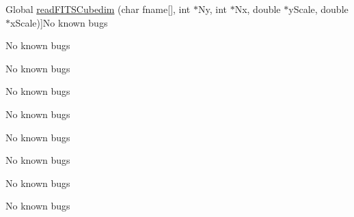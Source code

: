 \begin{DoxyRefList}
\hypertarget{bug__bug000016}{}%
Global \hyperlink{io_8c_ad0be222f95ff496610bb360e01aab56d}{read\+F\+I\+T\+S\+Cubedim} (char fname\mbox{[}\mbox{]}, int $\ast$\+Ny, int $\ast$\+Nx, double $\ast$y\+Scale, double $\ast$x\+Scale)]No known bugs 
\item[\label{bug__bug000015}%
\hypertarget{bug__bug000015}{}%
Global \hyperlink{io_8c_a1093cacb975cf9e6dc3845a1f65f53dd}{read\+F\+I\+T\+S\+Image} (char fname\mbox{[}\mbox{]}, int Ny, int Nx, int Npad, double $\ast$\+Image)]No known bugs 
\item[\label{bug__bug000014}%
\hypertarget{bug__bug000014}{}%
Global \hyperlink{io_8c_ae9ee556f23e84209607c2940391b6fa6}{read\+F\+I\+T\+S\+Imagedim} (char fname\mbox{[}\mbox{]}, int $\ast$\+Ny, int $\ast$\+Nx, double $\ast$y\+Scale, double $\ast$x\+Scale)]No known bugs 
\item[\label{bug__bug000023}%
\hypertarget{bug__bug000023}{}%
File \hyperlink{synthimage_8c}{synthimage.c} ]No known bugs 
\item[\label{bug__bug000009}%
\hypertarget{bug__bug000009}{}%
File \hyperlink{tabcalc_8c}{tabcalc.c} ]No known bugs 
\item[\label{bug__bug000010}%
\hypertarget{bug__bug000010}{}%
File \hyperlink{tablist_8c}{tablist.c} ]No known bugs 
\item[\label{bug__bug000011}%
\hypertarget{bug__bug000011}{}%
File \hyperlink{tabmerge_8c}{tabmerge.c} ]No known bugs 
\item[\label{bug__bug000019}%
\hypertarget{bug__bug000019}{}%
Global \hyperlink{io_8c_a9403cd46eafa834291081dcb30e0a528}{write\+F\+I\+T\+S\+Image} (char fname\mbox{[}\mbox{]}, int Npixel, double pixel\+Size, double $\ast$\+Image, char hist\mbox{[}\mbox{]})]No known bugs 
\item[\label{bug__bug000018}%
\hypertarget{bug__bug000018}{}%
Global \hyperlink{io_8c_ab884e4759cc79d219ef42f9e6835c2b1}{write\+F\+I\+T\+S\+Vis} (char fname\mbox{[}\mbox{]}, int Ny, int Nx, double $\ast$\+Vp, double $\ast$\+Va, double v\+Scale, double u\+Scale, char hist\mbox{[}\mbox{]})]No known bugs
\end{DoxyRefList}